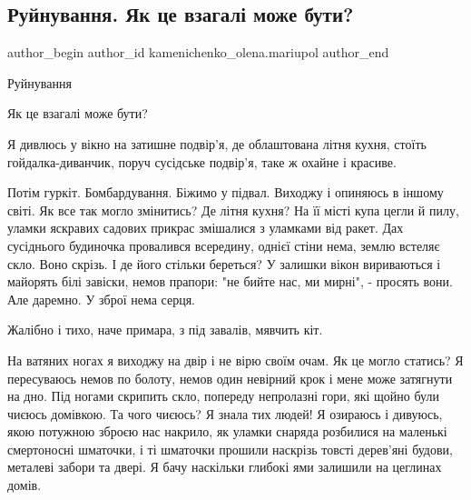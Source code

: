  
 
 
 
 

\subsection{Руйнування. Як це взагалі може бути?}
\label{sec:03_07_2022.fb.kamenichenko_olena.mariupol.1.ruinuvannya__yak_tse}

\ifcmt
 author_begin
   author_id kamenichenko_olena.mariupol
 author_end
\fi

Руйнування

Як це взагалі може бути?

Я дивлюсь  у вікно на затишне подвір'я, де облаштована літня кухня, стоїть
гойдалка-диванчик, поруч сусідське подвір'я, таке ж охайне і красиве. 

Потім гуркіт. Бомбардування. Біжимо у підвал. Виходжу і опиняюсь в іншому
світі. Як все так могло змінитись? Де літня кухня? На її місті купа цегли й
пилу, уламки яскравих садових прикрас змішалися з уламками від ракет. Дах
сусіднього будиночка провалився всередину, однієї стіни нема, землю встеляє
скло. Воно скрізь. І де його стільки береться? У залишки вікон вириваються і
майорять білі завіски, немов прапори: "не бийте нас, ми мирні", - просять вони.
Але даремно. У зброї нема серця.

Жалібно і тихо, наче примара, з під завалів, мявчить кіт.

На ватяних ногах я виходжу на двір і не вірю своїм очам. Як це могло статись? Я
пересуваюсь немов по болоту, немов один невірний крок і мене може затягнути на
дно. Під ногами скрипить скло, попереду непролазні гори, які щойно були чиєюсь
домівкою. Та чого чиєюсь? Я знала тих людей! Я озираюсь і дивуюсь, якою
потужною зброєю нас накрило, як уламки снаряда розбилися на маленькі
смертоносні шматочки, і ті шматочки прошили наскрізь товсті дерев'яні будови,
металеві забори та двері. Я бачу  наскільки глибокі ями залишили на цеглинах
домів.

